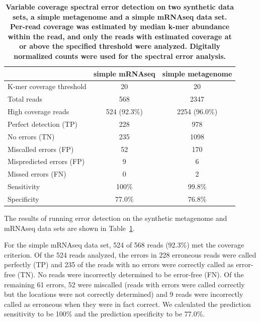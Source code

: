 \documentclass{article}
\begin{document}
\begin{table}
\begin{tabular}{|l|c||c|}
\hline
                            & {\bf simple mRNAseq } & {\bf simple metagenome}\\
\hline
K-mer coverage threshold    & 20                    & 20 \\
Total reads                 & 568                   & 2347 \\
High coverage reads         & 524 (92.3\%)          & 2254 (96.0\%) \\
\hline
Perfect detection (TP)      & 228                   & 978 \\
No errors (TN)              & 235                   & 1098 \\
Miscalled errors (FP)       & 52                    & 170\\
Mispredicted errors (FP)    & 9                     & 6 \\
Missed errors (FN)          & 0                     & 2 \\
\hline
Sensitivity                 & 100\%                 & 99.8\% \\
Specificity                 & 77.0\%                & 76.8\% \\
\hline
\end{tabular}

\caption{{\bf Variable coverage spectral error detection on two synthetic
  data sets, a simple metagenome and a simple mRNAseq data set.
  Per-read coverage was estimated by median k-mer abundance within the
  read, and only the reads with estimated coverage at or above the
  specified threshold were analyzed.  Digitally normalized counts were
  used for the spectral error analysis.}}
\label{tab:spectra_variable}
\end{table}

The results of running error detection on the synthetic metagenome and
mRNAseq data sets are shown in Table~\ref{tab:spectra_variable}.

For the simple mRNAseq data
set, 524 of 568 reads (92.3\%) met the coverage criterion.  Of the
524 reads analyzed, the errors in 228 erroneous reads were called
perfectly (TP) and 235 of the reads with no errors were correctly
called as error-free (TN).  No reads were incorrectly determined
to be error-free (FN).  Of the remaining 61 errors, 52 were miscalled
(reads with errors were called correctly but the locations were
not correctly determined) and 9 reads were incorrectly called as erroneous
when they were in fact correct.  We calculated the prediction
sensitivity to be 100\% and the prediction specificity to be
77.0\%.
\end{document}
